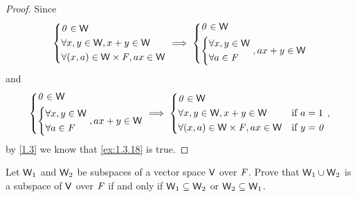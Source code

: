 \begin{proof}
  Since
  \[
    \begin{dcases}
      \mathit{0} \in \mathsf{W}                        \\
      \forall x, y \in \mathsf{W}, x + y \in \mathsf{W} \\
      \forall (x, a) \in \mathsf{W} \times \mathit{F}, ax \in \mathsf{W}
    \end{dcases} \implies \begin{dcases}
      \mathit{0} \in \mathsf{W} \\
      \begin{dcases}
        \forall x, y \in \mathsf{W} \\
        \forall a \in \mathit{F}
      \end{dcases}, ax + y \in \mathsf{W}
    \end{dcases}
  \]
  and
  \[
    \begin{dcases}
      \mathit{0} \in \mathsf{W} \\
      \begin{dcases}
        \forall x, y \in \mathsf{W} \\
        \forall a \in \mathit{F}
      \end{dcases}, ax + y \in \mathsf{W}
    \end{dcases} \implies \begin{dcases}
      \mathit{0} \in \mathsf{W}                                                      \\
      \forall x, y \in \mathsf{W}, x + y \in \mathsf{W}          & \text{if } a = 1   \\
      \forall (x, a) \in \mathsf{W} \times \mathit{F}, ax \in \mathsf{W} & \text{if } y = \mathit{0}
    \end{dcases},
  \]
  by \cref{1.3} we know that \cref{ex:1.3.18} is true.
\end{proof}

\begin{ex}\label{ex:1.3.19}
  Let \(\mathsf{W}_1\) and \(\mathsf{W}_2\) be subspaces of a vector space \(\mathsf{V}\) over \(\mathit{F}\).
  Prove that \(\mathsf{W}_1 \cup \mathsf{W}_2\) is a subspace of \(\mathsf{V}\) over \(\mathit{F}\) if and only if \(\mathsf{W}_1 \subseteq \mathsf{W}_2\) or \(\mathsf{W}_2 \subseteq \mathsf{W}_1\).
\end{ex}

